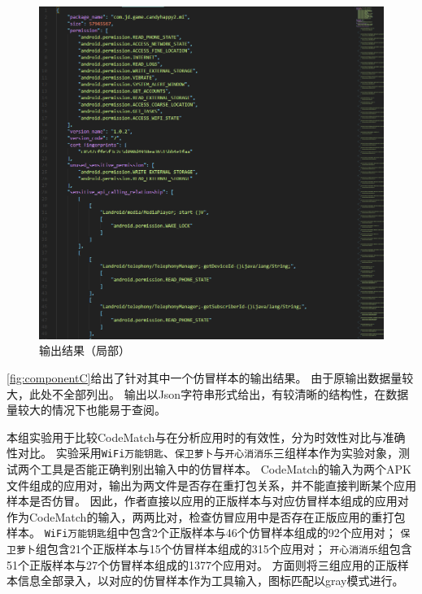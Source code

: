 \begin{figure}[ht]
    \centering
    \includegraphics[width=\textwidth]{./Figures/edwin-component-C.jpg}
    \caption{\componentC 输出结果（局部）}
    \label{fig:componentC}
    \vspace{-3mm}
\end{figure}

\autoref{fig:componentC}给出了\componentC 针对其中一个仿冒样本的输出结果。
由于原输出数据量较大，此处不全部列出。
输出以Json字符串形式给出，有较清晰的结构性，在数据量较大的情况下也能易于查阅。



本组实验用于比较CodeMatch与\mytool 在分析应用时的有效性，分为时效性对比与准确性对比。
实验采用\texttt{WiFi万能钥匙}、\texttt{保卫萝卜}与\texttt{开心消消乐}三组样本作为实验对象，测试两个工具是否能正确判别出输入中的仿冒样本。
CodeMatch的输入为两个APK文件组成的应用对，输出为两文件是否存在重打包关系，并不能直接判断某个应用样本是否仿冒。
因此，作者直接以应用的正版样本与对应仿冒样本组成的应用对作为CodeMatch的输入，两两比对，检查仿冒应用中是否存在正版应用的重打包样本。
\texttt{WiFi万能钥匙}组中包含2个正版样本与46个仿冒样本组成的92个应用对；
\texttt{保卫萝卜}组包含21个正版样本与15个仿冒样本组成的315个应用对；
\texttt{开心消消乐}组包含51个正版样本与27个仿冒样本组成的1377个应用对。
\mytool 方面则将三组应用的正版样本信息全部录入\componentD ，以对应的仿冒样本作为工具输入，图标匹配以gray模式进行。

